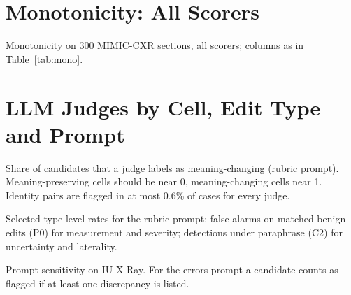 \documentclass[11pt]{article}
\begin{document}
\section{Monotonicity: All Scorers}
\label{app:mono}

\begin{table}[t]
\centering
\small
\begin{adjustbox}{max width=\textwidth}

\end{adjustbox}
\caption{Monotonicity on 300 MIMIC-CXR sections, all scorers; columns as in Table~\ref{tab:mono}.}
\label{tab:monofull}
\end{table}

\section{LLM Judges by Cell, Edit Type and Prompt}
\label{app:judges}
\label{app:prompt}

\begin{table}[t]
\centering
\small
\setlength{\tabcolsep}{4.5pt}
\begin{adjustbox}{max width=\textwidth}

\end{adjustbox}
\caption{Share of candidates that a judge labels as meaning-changing (rubric prompt). Meaning-preserving cells should be near 0, meaning-changing cells near 1. Identity pairs are flagged in at most 0.6\% of cases for every judge.}
\label{tab:judges}
\end{table}


\begin{table}[t]
\centering
\small
\begin{adjustbox}{max width=\textwidth}

\end{adjustbox}
\caption{Selected type-level rates for the rubric prompt: false alarms on matched benign edits (P0) for measurement and severity; detections under paraphrase (C2) for uncertainty and laterality.}
\label{tab:judgestypes}
\end{table}

\begin{table}[t]
\centering
\small
\begin{adjustbox}{max width=\textwidth}

\end{adjustbox}
\caption{Prompt sensitivity on IU X-Ray. For the errors prompt a candidate counts as flagged if at least one discrepancy is listed.}
\label{tab:prompt}
\end{table}
\end{document}
